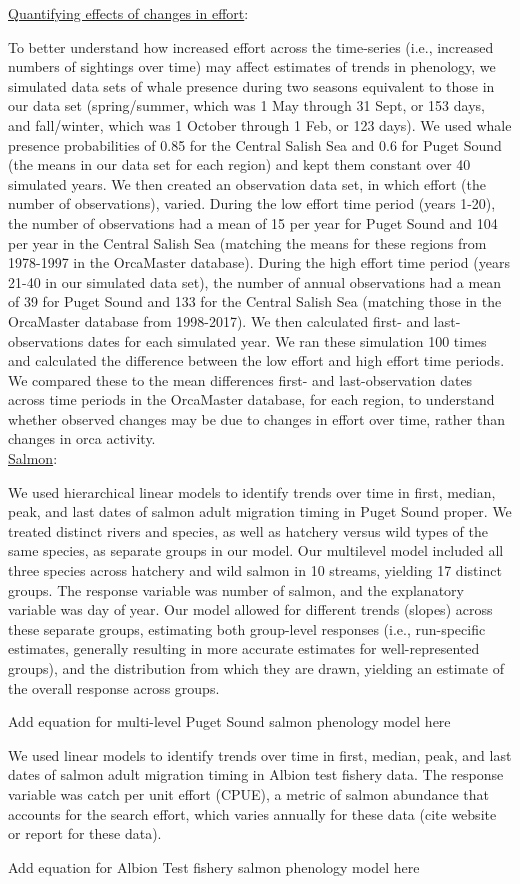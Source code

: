 \documentclass{article}
\begin{document}
\underline{Quantifying effects of changes in effort}:
\par To better understand how increased effort across the time-series (i.e., increased numbers of sightings over time) may affect estimates of trends in phenology, we simulated data sets of whale presence during two seasons equivalent to those in our data set (spring/summer, which was 1 May through 31 Sept, or 153 days, and fall/winter, which was 1 October through 1 Feb, or 123 days). We used whale presence probabilities of 0.85 for the Central Salish Sea and 0.6 for Puget Sound (the means in our data set for each region) and kept them constant over 40 simulated years. We then created an observation data set, in which effort (the number of observations), varied. During the low effort time period (years 1-20), the number of observations had a mean of 15 per year for Puget Sound and 104 per year in the Central Salish Sea (matching the means for these regions from 1978-1997 in the OrcaMaster database).  During the high effort time period (years 21-40 in our simulated data set), the number of annual observations had a mean of 39 for Puget Sound and 133 for the Central Salish Sea (matching those in the OrcaMaster database from 1998-2017). We then calculated first- and last- observations dates for each simulated year. We ran these simulation 100 times and calculated the difference between the low effort and high effort time periods. We compared these to the mean differences first- and last-observation dates across time periods in the OrcaMaster database, for each region, to understand whether observed changes may be due to changes in effort over time, rather than changes in orca activity.\\
\underline{Salmon}:
\par We used hierarchical linear models to identify trends over time in first, median, peak, and last dates of salmon adult migration timing in Puget Sound proper. We treated distinct rivers and species, as well as hatchery versus wild types of the same species, as separate groups in our model. Our multilevel model included all three species across hatchery and wild salmon in 10 streams, yielding 17 distinct groups. The response variable was number of salmon, and the explanatory variable was day of year. Our model allowed for different trends (slopes) across these separate groups, estimating both group-level responses (i.e., run-specific estimates, generally resulting in more accurate estimates for well-represented groups), and the distribution from which they are drawn, yielding an estimate of the overall response across groups.
\par Add equation for multi-level Puget Sound salmon phenology model here
\par We used linear models to identify trends over time in first, median, peak, and last dates of salmon adult migration timing in Albion test fishery data. The response variable was catch per unit effort (CPUE), a metric of salmon abundance that accounts for the search effort, which varies annually for these data (cite website or report for these data).
\par Add equation for Albion Test fishery salmon phenology model here
\end{document}
